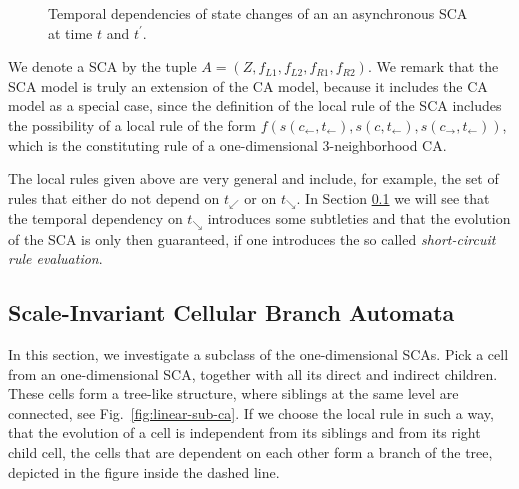 \documentclass[pre,amssymb,showpacs,showkeys,preprint]{revtex4}
\begin{document}
\begin{figure}
\begin{center}
\caption{\label{fig:1-dim-state-changes} Temporal dependencies of state changes of an an
asynchronous SCA at time $t$ and $t^\prime$.}
\end{center}
\end{figure}

We denote a SCA by the tuple $A = (Z, f_{L1}, f_{L2}, f_{R1}, f_{R2})$.
We remark that the SCA model is truly an extension of the CA model, because it includes the CA model
as a special case, since the definition of the local rule of the
SCA includes the possibility of a local rule of the form
$f(s(c_\leftarrow, t_\leftarrow), s(c, t_\leftarrow), s(c_\rightarrow, t_\leftarrow))$,
which is the constituting rule of a one-dimensional 3-neighborhood CA.

The local rules given above are very general and include, for example, the set of rules that either
do not depend on $t_\swarrow$ or on $t_\searrow$.
In Section \ref{sec-sim-tm-with-sca} we will see that the temporal dependency on
$t_\searrow$ introduces some subtleties and that the evolution of the SCA is only then guaranteed,
if one introduces the so called \emph{short-circuit rule evaluation}.

\subsection{Scale-Invariant Cellular Branch Automata}
\label{sec-sim-tm-with-sca}

In this section, we investigate a subclass of the one-dimensional SCAs.
Pick a cell from an one-dimensional SCA, together with all its direct and indirect children.
These cells form a tree-like structure, where siblings at the same level are connected,
see Fig.~\ref{fig:linear-sub-ca}.
If we choose the local rule in such a way, that the evolution of a cell is independent from its
siblings and from its right child cell, the cells that are dependent on each other form a branch of the tree,
depicted in the figure inside the dashed line.
\end{document}
